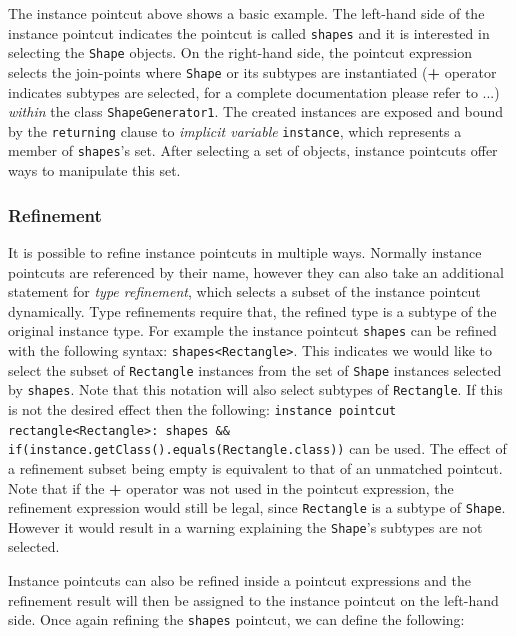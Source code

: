\documentclass{llncs}
\begin{document}
The instance pointcut above shows a basic example. The left-hand side of the instance pointcut indicates the pointcut is called \texttt{shapes} and it is interested in selecting the \texttt{Shape} objects. On the right-hand side, the pointcut expression selects the join-points where \texttt{Shape} or its subtypes are instantiated (\textbf{+} operator indicates subtypes are selected, for a complete documentation please refer to ...) \emph{within} the class \texttt{ShapeGenerator1}. The created instances are exposed and bound by the \texttt{returning} clause to \emph{implicit variable} \texttt{instance}, which represents a member of \texttt{shapes}'s set. After selecting a set of objects, instance pointcuts offer ways to manipulate this set. 



\subsubsection{Refinement} 
It is possible to refine instance pointcuts in multiple ways. Normally instance pointcuts are referenced by their name, however they can also take an additional statement for \emph{type refinement}, which selects a subset of the instance pointcut dynamically. Type refinements require that, the refined type is a subtype of the original instance type. For example the instance pointcut \texttt{shapes} can be refined with the following syntax: \lstinline!shapes<Rectangle>!. This indicates we would like to select the subset of \texttt{Rectangle} instances from the set of \texttt{Shape} instances selected by \texttt{shapes}. Note that this notation will also select subtypes of \texttt{Rectangle}. If this is not the desired effect then the following: \lstinline!instance pointcut rectangle<Rectangle>: shapes && if(instance.getClass().equals(Rectangle.class))! can be used. The effect of a refinement subset being empty is equivalent to that of an unmatched pointcut. Note that if the \textbf{+} operator was not used in the pointcut expression, the refinement expression would still be legal, since \texttt{Rectangle} is a subtype of \texttt{Shape}. However it would result in a warning explaining the \texttt{Shape}'s subtypes are not selected.


Instance pointcuts can also be refined inside a pointcut expressions and the refinement result will then be assigned to the instance pointcut on the left-hand side. Once again refining the \texttt{shapes} pointcut, we can define the following:
\end{document}
